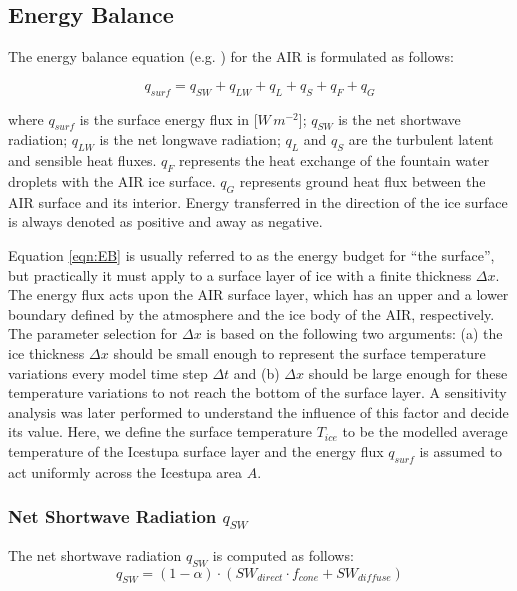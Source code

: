 \documentclass[utf8]{frontiersSCNS} %
\begin{document}
\subsection{Energy Balance} \label{section:EB}

The energy balance equation (e.g. \citep{Hock_2005}) for the AIR is formulated as follows:

\begin{equation} q_{surf} = q_{SW} + q_{LW} + q_{L} + q_{S} + q_{F} + q_{G}\label{eqn:EB} \end{equation}

where $q_{surf}$ is the surface energy flux in [$W\,m^{-2}$]; $q_{SW}$ is the net shortwave radiation; $q_{LW}$ is the
net longwave radiation; $q_{L}$ and $q_{S}$ are the turbulent latent and sensible heat fluxes. $q_{F}$ represents the
heat exchange of the fountain water droplets with the AIR ice surface. $q_{G}$ represents ground heat flux between the
AIR surface and its interior. Energy transferred in the direction of the ice surface is always denoted as positive and
away as negative.

Equation \ref{eqn:EB} is usually referred to as the energy budget for “the surface”, but practically it must apply to a
surface layer of ice with a finite thickness $\Delta x$. The energy flux acts upon the AIR surface layer, which has an
upper and a lower boundary defined by the atmosphere and the ice body of the AIR, respectively. The parameter selection
for $\Delta x$ is based on the following two arguments: (a) the ice thickness $\Delta x$ should be small enough to
represent the surface temperature variations every model time step $\Delta t$ and (b) $\Delta x$ should be large enough
for these temperature variations to not reach the bottom of the surface layer. A sensitivity analysis was later
performed to understand the influence of this factor and decide its value. Here, we define the surface temperature
$T_{ice}$ to be the modelled average temperature of the Icestupa surface layer and the energy flux $q_{surf}$ is assumed
to act uniformly across the Icestupa area $A$.

\subsubsection{Net Shortwave Radiation \texorpdfstring{$q_{SW}$}{Lg}}

The net shortwave radiation $q_{SW}$ is computed as follows:
\begin{equation} q_{SW} = (1- \alpha)\cdot (SW_{direct} \cdot f_{cone} + SW_{diffuse}) \label{eqn:SW} \end{equation}
\end{document}
